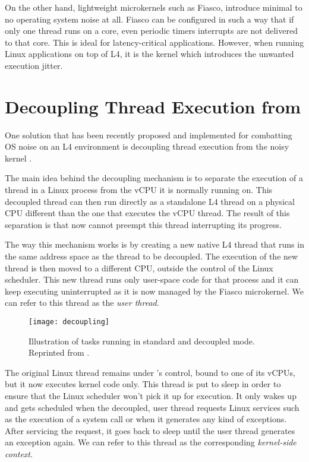 On the other hand, lightweight microkernels such as Fiasco, introduce minimal
to no operating system noise at all. Fiasco can be configured in such a way
that if only one thread runs on a core, even periodic timers interrupts are not
delivered to that core. This is ideal for latency-critical applications.
However, when running Linux applications on top of L4, it is the \llinux kernel
which introduces the unwanted execution jitter.

\section{Decoupling Thread Execution from \llinux}
\label{sec:decoupling}

One solution that has been recently proposed and implemented for combatting OS
noise on an L4 environment is decoupling thread execution from the noisy
\llinux kernel \cite{decoupling}.

The main idea behind the decoupling mechanism is to separate the execution of a
thread in a Linux process from the vCPU it is normally running on. This
decoupled thread can then run directly as a standalone L4 thread on a physical
CPU different than the one that executes the vCPU thread. The result of this
separation is that now \llinux cannot preempt this thread interrupting its
progress.

The way this mechanism works is by creating a new native L4 thread that runs in
the same address space as the thread to be decoupled. The execution of the new
thread is then moved to a different CPU, outside the control of the Linux
scheduler. This new thread runs only user-space code for that process and it
can keep executing uninterrupted as it is now managed by the Fiasco
microkernel. We can refer to this thread as the \emph{user thread}.

\begin{figure}[h]
\centering
\texttt{[image: decoupling]}
\caption{Illustration of \llinux tasks running in standard and decoupled mode.
         Reprinted from \cite{decoupling}.}
\label{fig:decoupling}
\end{figure}

The original Linux thread remains under \llinux's control, bound to one of its
vCPUs, but it now executes kernel code only. This thread is put to sleep in
order to ensure that the Linux scheduler won't pick it up for execution.  It
only wakes up and gets scheduled when the decoupled, user thread requests Linux
services such as the execution of a \llinux system call or when it generates
any kind of exceptions. After servicing the request, it goes back to sleep
until the user thread generates an exception again. We can refer to this thread
as the corresponding \emph{kernel-side context}.

